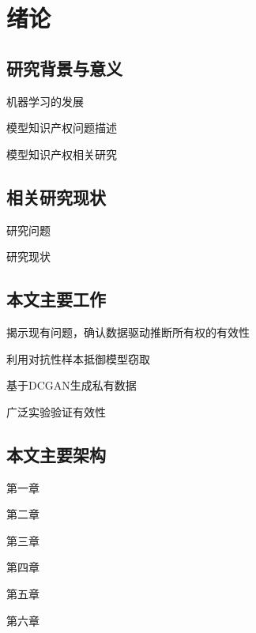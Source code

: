 
\chapter{绪论}
\label{1}


\section{研究背景与意义}

机器学习的发展

模型知识产权问题描述

模型知识产权相关研究

\section{相关研究现状}

研究问题

研究现状

\section{本文主要工作}

揭示\cite{maini2021dataset}现有问题，确认数据驱动推断所有权的有效性

利用对抗性样本抵御模型窃取

基于DCGAN生成私有数据

广泛实验验证有效性

\section{本文主要架构}

第一章

第二章

第三章

第四章

第五章

第六章